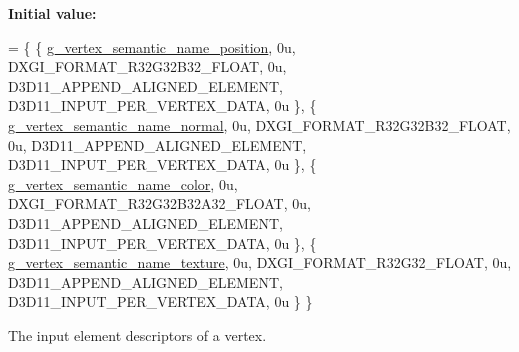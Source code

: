 {\bfseries Initial value\+:}
\begin{DoxyCode}
= \{
        \{ \hyperlink{namespacemage_1_1rendering_ae0a999915bd61d5a9d8addc04fe0646a}{g\_vertex\_semantic\_name\_position}, 0u, DXGI\_FORMAT\_R32G32B32\_FLOAT, 
         0u, D3D11\_APPEND\_ALIGNED\_ELEMENT, D3D11\_INPUT\_PER\_VERTEX\_DATA, 0u \},
        \{ \hyperlink{namespacemage_1_1rendering_aef3f964c7435c0b2009c7c5390ee3234}{g\_vertex\_semantic\_name\_normal},   0u, DXGI\_FORMAT\_R32G32B32\_FLOAT,   
       0u, D3D11\_APPEND\_ALIGNED\_ELEMENT, D3D11\_INPUT\_PER\_VERTEX\_DATA, 0u \},
        \{ \hyperlink{namespacemage_1_1rendering_a30c6185c03e23c5719a43ac9120d6f90}{g\_vertex\_semantic\_name\_color},    0u, DXGI\_FORMAT\_R32G32B32A32\_FLOAT, 
      0u, D3D11\_APPEND\_ALIGNED\_ELEMENT, D3D11\_INPUT\_PER\_VERTEX\_DATA, 0u \},
        \{ \hyperlink{namespacemage_1_1rendering_a6db7535ff83c660f8b7ce8eed50178c6}{g\_vertex\_semantic\_name\_texture},  0u, DXGI\_FORMAT\_R32G32\_FLOAT,     
        0u, D3D11\_APPEND\_ALIGNED\_ELEMENT, D3D11\_INPUT\_PER\_VERTEX\_DATA, 0u \}
    \}
\end{DoxyCode}
The input element descriptors of a vertex. 